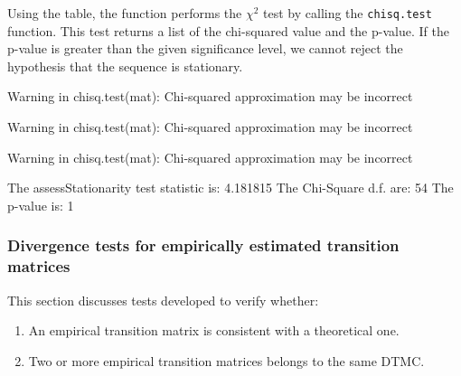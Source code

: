 \documentclass[article,nojss]{jss}
\providecommand{\tightlist}{%
  \setlength{\itemsep}{0pt}\setlength{\parskip}{0pt}}
\begin{document}
Using the table, the function performs the \(\chi ^2\) test by calling the \texttt{chisq.test} function.
This test returns a list of the chi-squared value and the p-value.
If the p-value is greater than the given significance level, we cannot reject the hypothesis that the sequence is stationary.

\begin{CodeChunk}



\begin{CodeOutput}
Warning in chisq.test(mat): Chi-squared approximation may be incorrect
\end{CodeOutput}

\begin{CodeOutput}
Warning in chisq.test(mat): Chi-squared approximation may be incorrect
\end{CodeOutput}

\begin{CodeOutput}
Warning in chisq.test(mat): Chi-squared approximation may be incorrect
\end{CodeOutput}

\begin{CodeOutput}
The assessStationarity test statistic is:  4.181815 
The Chi-Square d.f. are:  54 
The p-value is:  1 
\end{CodeOutput}
\end{CodeChunk}

\hypertarget{divergence-tests-for-empirically-estimated-transition-matrices}{%
\subsubsection{Divergence tests for empirically estimated transition matrices}\label{divergence-tests-for-empirically-estimated-transition-matrices}}

This section discusses tests developed to verify whether:

\begin{enumerate}
\def\labelenumi{\arabic{enumi}.}
\tightlist
\item
  An empirical transition matrix is consistent with a theoretical one.\\
\item
  Two or more empirical transition matrices belongs to the same DTMC.
\end{enumerate}
\end{document}
